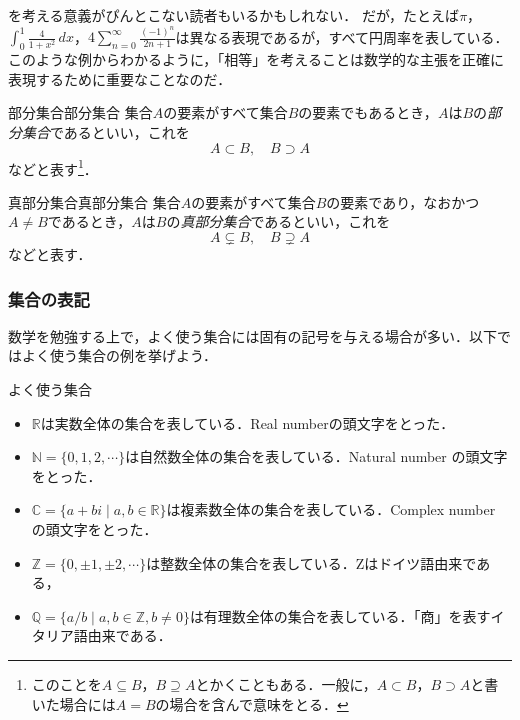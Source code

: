 \begin{mycolumn}
  を考える意義がぴんとこない読者もいるかもしれない．
  だが，たとえば$\pi$，$\int_{0}^{1} \frac{4}{1+x^2} \, dx$，$4 \sum_{n=0}^{\infty} \frac{(-1)^n}{2n+1}$は異なる表現であるが，すべて円周率を表している．
  このような例からわかるように，「相等」を考えることは数学的な主張を正確に表現するために重要なことなのだ．
\end{mycolumn}

\begin{definition}{部分集合}{部分集合}
  集合$A$の要素がすべて集合$B$の要素でもあるとき，$A$は$B$の\emph{部分集合}であるといい，これを
  \[
    A \subset B,\quad B \supset A
  \]
  などと表す\footnote{このことを$ A \subseteq B$，$B \supseteq A$とかくこともある．一般に，$A \subset B$，$ B \supset A$と書いた場合には$A=B$の場合を含んで意味をとる．}．
\end{definition}

\begin{definition}{真部分集合}{真部分集合}
  集合$A$の要素がすべて集合$B$の要素であり，なおかつ$A \ne B$であるとき，$A$は$B$の\emph{真部分集合}であるといい，これを
  \[
    A \subsetneq B,\quad B \supsetneq A
  \]
  などと表す．
\end{definition}

\subsubsection{集合の表記}

数学を勉強する上で，よく使う集合には固有の記号を与える場合が多い．以下ではよく使う集合の例を挙げよう．

\begin{shadebox}
  よく使う集合
  \begin{itemize}
    \item $\mathbb{R}$は実数全体の集合を表している．Real numberの頭文字をとった．
    \item $\mathbb{N}=\{0,1,2,\cdots \}$は自然数全体の集合を表している．Natural number の頭文字をとった．
    \item $\mathbb{C}=\{ a+bi \mid a,b \in \mathbb{R}\}$は複素数全体の集合を表している．Complex number の頭文字をとった．
    \item $\mathbb{Z}=\{0, \pm 1 , \pm 2 , \cdots\}$は整数全体の集合を表している．Zはドイツ語由来である，
    \item $\mathbb{Q}=\{ a/b \mid   a,b \in \mathbb{Z},b \ne 0 \}$は有理数全体の集合を表している．「商」を表すイタリア語由来である．
  \end{itemize}
\end{shadebox}


